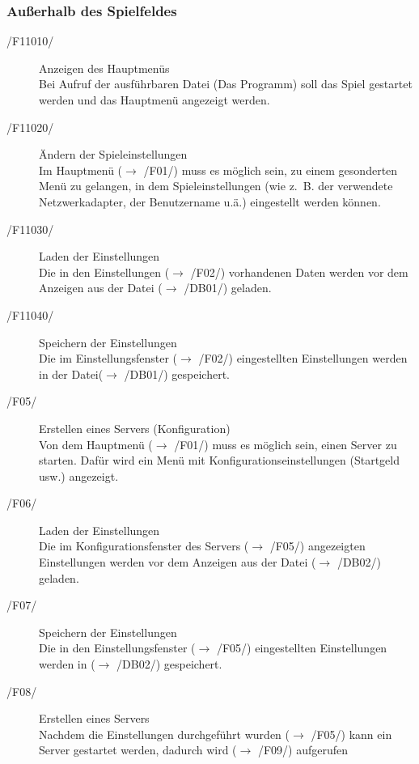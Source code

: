 \documentclass[a4paper,10pt]{article}
\begin{document}
\subsubsection{Außerhalb des Spielfeldes}
\begin{description}
\item[/F11010/] Anzeigen des Hauptmenüs \\
Bei Aufruf der ausführbaren Datei (Das Programm) soll das Spiel gestartet werden und das Hauptmenü angezeigt werden.

\item[/F11020/] Ändern der Spieleinstellungen \\
Im Hauptmenü ($\rightarrow$ /F01/) muss es möglich sein, zu einem gesonderten Menü zu gelangen, in dem Spieleinstellungen (wie z.~B. der verwendete Netzwerkadapter, der Benutzername u.ä.) eingestellt werden können.

\item[/F11030/] Laden der Einstellungen \\
Die in den Einstellungen ($\rightarrow$ /F02/) vorhandenen Daten werden vor dem Anzeigen aus der Datei ($\rightarrow$ /DB01/) geladen.

\item[/F11040/] Speichern der Einstellungen \\
Die im Einstellungsfenster ($\rightarrow$ /F02/) eingestellten Einstellungen werden in der Datei($\rightarrow$ /DB01/) gespeichert.

\item[/F05/] Erstellen eines Servers (Konfiguration) \\
Von dem Hauptmenü ($\rightarrow$ /F01/) muss es möglich sein, einen Server zu starten. Dafür wird ein Menü mit Konfigurationseinstellungen (Startgeld usw.) angezeigt.

\item[/F06/] Laden der Einstellungen \\
Die im Konfigurationsfenster des Servers ($\rightarrow$ /F05/) angezeigten Einstellungen werden vor dem Anzeigen aus der Datei ($\rightarrow$ /DB02/) geladen.

\item[/F07/] Speichern der Einstellungen \\
Die in den Einstellungsfenster ($\rightarrow$ /F05/) eingestellten Einstellungen werden in ($\rightarrow$ /DB02/) gespeichert.

\item[/F08/] Erstellen eines Servers \\
Nachdem die Einstellungen durchgeführt wurden ($\rightarrow$ /F05/) kann ein Server gestartet werden, dadurch wird ($\rightarrow$ /F09/) aufgerufen


\end{description}
\end{document}
